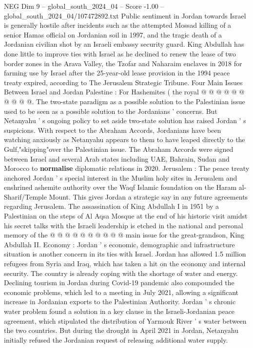 \begin{textsample}{NEG Dim 9 – global\_south\_2024\_04 – Score -1.00 – global\_south\_2024\_04/107472892.txt}
Public sentiment in Jordan towards Israel is generally hostile after incidents such as the attempted Mossad killing of a senior Hamas official on Jordanian soil in 1997, and the tragic death of a Jordanian civilian shot by an Israeli embassy security guard.
King Abdullah has done little to improve ties with Israel as he declined to renew the lease of two border zones in the Arava Valley, the Tzofar and Naharaim enclaves in 2018 for farming use by Israel after the 25-year-old lease provision in the 1994 peace treaty expired, according to The Jerusalem Strategic Tribune.
Four Main Issues Between Israel and Jordan Palestine : For Hashemites ( the royal @ @ @ @ @ @ @ @ @ @.
The two-state paradigm as a possible solution to the Palestinian issue used to be seen as a possible solution to the Jordanians ' concerns.
But Netanyahu ' s ongoing policy to set aside two-state solution has raised Jordan ' s suspicions.
With respect to the Abraham Accords, Jordanians have been watching anxiously as Netanyahu appears to them to have leaped directly to the Gulf,"skipping"over the Palestinian issue.
The Abraham Accords were signed between Israel and several Arab states including UAE, Bahrain, Sudan and Morocco to \textbf{normalise} diplomatic relations in 2020.
Jerusalem : The peace treaty anchored Jordan ' s special interest in the Muslim holy sites in Jerusalem and enshrined ashemite authority over the Waqf Islamic foundation on the Haram al-Sharif/Temple Mount.
This gives Jordan a strategic say in any future agreements regarding Jerusalem.
The assassination of King Abdullah I in 1951 by a Palestinian on the steps of Al Aqsa Mosque at the end of his historic visit amidst his secret talks with the Israeli leadership is etched in the national and personal memory of the @ @ @ @ @ @ @ @ @ @ main issue for the great-grandson, King Abdullah II.
Economy : Jordan ' s economic, demographic and infrastructure situation is another concern in its ties with Israel.
Jordan has allowed 1.5 million refugees from Syria and Iraq, which has taken a hit on the economy and internal security.
The country is already coping with the shortage of water and energy.
Declining tourism in Jordan during Covid-19 pandemic also compounded the economic problems, which led to a meeting in July 2021, allowing a significant increase in Jordanian exports to the Palestinian Authority.
Jordan ' s chronic water problem found a solution in a key clause in the Israeli-Jordanian peace agreement, which stipulated the distribution of Yarmouk River ' s water between the two countries.
But during the drought in April 2021 in Jordan, Netanyahu initially refused the Jordanian request of releasing additional water supply.

\end{textsample}
